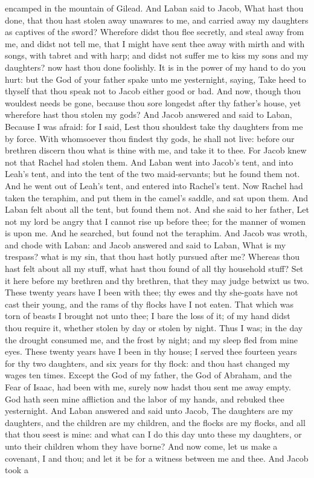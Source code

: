 encamped in the mountain of Gilead. And Laban said to Jacob, What hast thou done, that thou hast stolen away unawares to me, and carried away my daughters as captives of the sword? Wherefore didst thou flee secretly, and steal away from me, and didst not tell me, that I might have sent thee away with mirth and with songs, with tabret and with harp; and didst not suffer me to kiss my sons and my daughters? now hast thou done foolishly. It is in the power of my hand to do you hurt: but the God of your father spake unto me yesternight, saying, Take heed to thyself that thou speak not to Jacob either good or bad. And now, though thou wouldest needs be gone, because thou sore longedst after thy father’s house, yet wherefore hast thou stolen my gods? And Jacob answered and said to Laban, Because I was afraid: for I said, Lest thou shouldest take thy daughters from me by force. With whomsoever thou findest thy gods, he shall not live: before our brethren discern thou what is thine with me, and take it to thee. For Jacob knew not that Rachel had stolen them.  And Laban went into Jacob’s tent, and into Leah’s tent, and into the tent of the two maid-servants; but he found them not. And he went out of Leah’s tent, and entered into Rachel’s tent. Now Rachel had taken the teraphim, and put them in the camel’s saddle, and sat upon them. And Laban felt about all the tent, but found them not. And she said to her father, Let not my lord be angry that I cannot rise up before thee; for the manner of women is upon me. And he searched, but found not the teraphim.  And Jacob was wroth, and chode with Laban: and Jacob answered and said to Laban, What is my trespass? what is my sin, that thou hast hotly pursued after me? Whereas thou hast felt about all my stuff, what hast thou found of all thy household stuff? Set it here before my brethren and thy brethren, that they may judge betwixt us two. These twenty years have I been with thee; thy ewes and thy she-goats have not cast their young, and the rams of thy flocks have I not eaten. That which was torn of beasts I brought not unto thee; I bare the loss of it; of my hand didst thou require it, whether stolen by day or stolen by night. Thus I was; in the day the drought consumed me, and the frost by night; and my sleep fled from mine eyes. These twenty years have I been in thy house; I served thee fourteen years for thy two daughters, and six years for thy flock: and thou hast changed my wages ten times. Except the God of my father, the God of Abraham, and the Fear of Isaac, had been with me, surely now hadst thou sent me away empty. God hath seen mine affliction and the labor of my hands, and rebuked thee yesternight.  And Laban answered and said unto Jacob, The daughters are my daughters, and the children are my children, and the flocks are my flocks, and all that thou seest is mine: and what can I do this day unto these my daughters, or unto their children whom they have borne? And now come, let us make a covenant, I and thou; and let it be for a witness between me and thee. And Jacob took a 